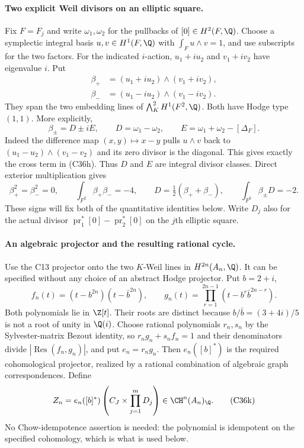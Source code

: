 \paragraph{Two explicit Weil divisors on an elliptic square.}
Fix $F=F_j$ and write $\omega_1,\omega_2$ for the
pullbacks of $[0]\in H^2(F,\Q)$. Choose a symplectic
integral basis $u,v\in H^1(F,\Q)$ with
$\int_Fu\wedge v=1$, and use subscripts for the two
factors. For the indicated $i$-action,
$u_1+i u_2$ and $v_1+i v_2$ have eigenvalue $i$.
Put
\[
 \begin{split}
 \beta_+&=(u_1+i u_2)\wedge(v_1+i v_2),\\
 \beta_-&=(u_1-i u_2)\wedge(v_1-i v_2).
 \end{split}
 \tag{C36g}
\]
They span the two embedding lines of
$\bigwedge_K^2H^1(F^2,\Q)$. Both have Hodge type
$(1,1)$. More explicitly,
\[
 \beta_\pm=D\pm iE,\qquad
 D=\omega_1-\omega_2,\qquad
 E=\omega_1+\omega_2-[\Delta_F].
 \tag{C36h}
\]
Indeed the difference map $(x,y)\mapsto x-y$ pulls
$u\wedge v$ back to
$(u_1-u_2)\wedge(v_1-v_2)$ and its zero divisor is
the diagonal. This gives exactly the cross term in
(C36h). Thus $D$ and $E$ are integral divisor classes.
Direct exterior multiplication gives
\[
 \beta_+^2=\beta_-^2=0,\qquad
 \int_{F^2}\beta_+\beta_-=-4,\qquad
 D=\tfrac12(\beta_++\beta_-),\qquad
 \int_{F^2}\beta_\pm D=-2.
 \tag{C36i}
\]
These signs will fix both of the quantitative identities
below. Write $D_j$ also for the actual divisor
$\operatorname{pr}_1^*[0]-\operatorname{pr}_2^*[0]$
on the $j$th elliptic square.

\paragraph{An algebraic projector and the resulting rational cycle.}
Use the C13 projector onto the two $K$-Weil lines in
$H^{2n}(A_n,\Q)$. It can be specified without any
choice of an abstract Hodge projector. Put $b=2+i$,
\[
 f_n(t)=(t-b^{2n})(t-\bar b^{2n}),\qquad
 g_n(t)=\prod_{r=1}^{2n-1}
                       (t-b^r\bar b^{2n-r}).
 \tag{C36j}
\]
Both polynomials lie in $\Z[t]$. Their roots are
distinct because $b/\bar b=(3+4i)/5$ is not a root
of unity in $\Q(i)$. Choose rational polynomials
$r_n,s_n$ by the Sylvester-matrix Bezout identity, so
$r_ng_n+s_nf_n=1$ and their denominators divide
$|\operatorname{Res}(f_n,g_n)|$, and put
$e_n=r_ng_n$. Then $e_n([b]^*)$ is the required
cohomological projector, realized by a rational
combination of algebraic graph correspondences.
Define
\[
 Z_n=e_n([b]^*)\left(C_J\times
                              \prod_{j=1}^mD_j\right)
                  \in\CH^n(A_n)_\Q.
 \tag{C36k}
\]
No Chow-idempotence assertion is needed: the polynomial
is idempotent on the specified cohomology, which is
what is used below.

